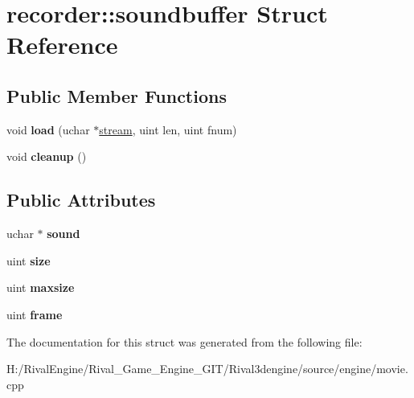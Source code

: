 \hypertarget{structrecorder_1_1soundbuffer}{}\section{recorder\+:\+:soundbuffer Struct Reference}
\label{structrecorder_1_1soundbuffer}
\subsection*{Public Member Functions}
\begin{DoxyCompactItemize}
\item 
\mbox{\label{structrecorder_1_1soundbuffer_ab6ed6e67f823f948a1c39a489a86aae9}} 
void {\bfseries load} (uchar $\ast$\hyperlink{structstream}{stream}, uint len, uint fnum)
\item 
\mbox{\label{structrecorder_1_1soundbuffer_a33cb72389d975d22b0150c2d0535f5d5}} 
void {\bfseries cleanup} ()
\end{DoxyCompactItemize}
\subsection*{Public Attributes}
\begin{DoxyCompactItemize}
\item 
\mbox{\label{structrecorder_1_1soundbuffer_a5da4cc609f293cc5e2457a506e525df0}} 
uchar $\ast$ {\bfseries sound}
\item 
\mbox{\label{structrecorder_1_1soundbuffer_ab0f9054f711411b24e45cbdd33a27c05}} 
uint {\bfseries size}
\item 
\mbox{\label{structrecorder_1_1soundbuffer_a86b3ef9822b2855ed2413540e333cf66}} 
uint {\bfseries maxsize}
\item 
\mbox{\label{structrecorder_1_1soundbuffer_ab0e816ced5e4a9c8a85857db1c31a854}} 
uint {\bfseries frame}
\end{DoxyCompactItemize}


The documentation for this struct was generated from the following file\+:\begin{DoxyCompactItemize}
\item 
H\+:/\+Rival\+Engine/\+Rival\+\_\+\+Game\+\_\+\+Engine\+\_\+\+G\+I\+T/\+Rival3dengine/source/engine/movie.\+cpp\end{DoxyCompactItemize}
